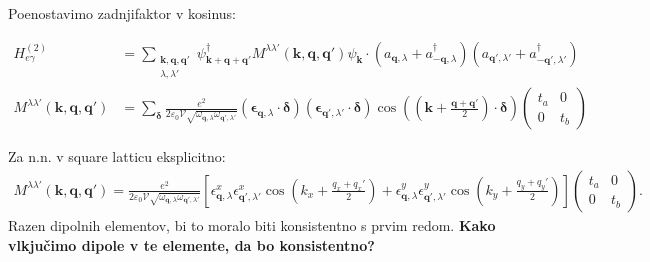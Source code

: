 \documentclass[a4paper,10pt]{article}
\begin{document}
Poenostavimo zadnjifaktor v kosinus:
\begin{tcolorbox}
\begin{align}
  H_{e\gamma}^{(2)} &= \sum_{\substack{\mathbf{k}, \mathbf{q}, \mathbf{q}' \\ \lambda, \lambda'}} \psi_{\mathbf{k}+\mathbf{q}+\mathbf{q}'}^\dagger {M^{\lambda \lambda'}(\mathbf{k}, \mathbf{q}, \mathbf{q}')} \psi_{\mathbf{k}} \cdot (a_{\mathbf{q},\lambda} + a_{-\mathbf{q},\lambda}^\dagger)(a_{\mathbf{q}',\lambda'} + a_{-\mathbf{q}',\lambda'}^\dagger) \\[8pt]
  M^{\lambda \lambda'}(\mathbf{k}, \mathbf{q}, \mathbf{q}') &=  \sum_{\boldsymbol{\delta}} \frac{e^2} {2\varepsilon_0\mathcal V \sqrt{\omega_{\mathbf q,\lambda}\omega_{\mathbf q',\lambda'}}} (\boldsymbol{\epsilon}_{\mathbf{q},\lambda} \cdot \boldsymbol{\delta}) (\boldsymbol{\epsilon}_{\mathbf{q}',\lambda'} \cdot \boldsymbol{\delta})\cos\left(\left(\mathbf{k} + \frac{\mathbf{q}+\mathbf{q}'}{2}\right) \cdot \boldsymbol{\delta}\right) \begin{pmatrix} t_a & 0 \\ 0 & t_b \end{pmatrix}
\end{align}
\end{tcolorbox}
Za n.n. v square latticu eksplicitno: 
\begin{align}
  M^{\lambda\lambda'}(\mathbf k,\mathbf q,\mathbf q') = \frac{e^2} {2\varepsilon_0\mathcal V \sqrt{\omega_{\mathbf q,\lambda}\omega_{\mathbf q',\lambda'}}} \left[ \epsilon_{\mathbf q,\lambda}^{x} \epsilon_{\mathbf q',\lambda'}^{x} \cos\!\left(k_x+\frac{q_x+q_x'}2\right) + \epsilon_{\mathbf q,\lambda}^{y} \epsilon_{\mathbf q',\lambda'}^{y} \cos\!\left(k_y+\frac{q_y+q_y'}2\right) \right] \begin{pmatrix}t_a&0\\0&t_b\end{pmatrix}.
\end{align}
Razen dipolnih elementov, bi to moralo biti konsistentno s prvim redom. \textbf{Kako vlkjučimo dipole v te elemente, da bo konsistentno?}
\end{document}
